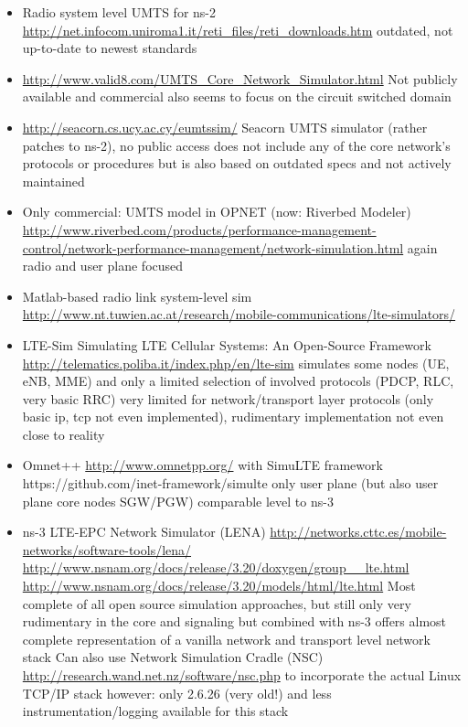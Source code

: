 \begin{itemize}

	\item Radio system level UMTS for ns-2
\url{http://net.infocom.uniroma1.it/reti_files/reti_downloads.htm}
outdated, not up-to-date to newest standards

	\item \url{http://www.valid8.com/UMTS_Core_Network_Simulator.html} Not publicly available and commercial
also seems to focus on the circuit switched domain

	\item \url{http://seacorn.cs.ucy.ac.cy/eumtssim/}
\cite{vranjevs2011use}
Seacorn UMTS simulator (rather patches to ns-2), no public access
does not include any of the core network's protocols or procedures
but is also based on outdated specs and not actively maintained

	\item Only commercial: UMTS model in OPNET (now: Riverbed Modeler)
\url{http://www.riverbed.com/products/performance-management-control/network-performance-management/network-simulation.html}
again radio and user plane focused 

	\item Matlab-based radio link system-level sim
\url{http://www.nt.tuwien.ac.at/research/mobile-communications/lte-simulators/}

	\item LTE-Sim
Simulating LTE Cellular Systems: An Open-Source Framework \cite{5634134}
\url{http://telematics.poliba.it/index.php/en/lte-sim}
simulates some nodes (UE, eNB, MME) and only a limited selection of involved protocols (PDCP, RLC, very basic RRC)
very limited for network/transport layer protocols (only basic ip, tcp not even implemented), rudimentary implementation not even close to reality

	\item Omnet++ \url{http://www.omnetpp.org/}
with SimuLTE framework https://github.com/inet-framework/simulte
only user plane (but also user plane core nodes SGW/PGW)
comparable level to ns-3

	\item ns-3
\gls{LTE}-\gls{EPC} Network Simulator (LENA)\cite{Baldo:2013:OSM:2507924.2507940} 
\url{http://networks.cttc.es/mobile-networks/software-tools/lena/}
\url{http://www.nsnam.org/docs/release/3.20/doxygen/group__lte.html}
\url{http://www.nsnam.org/docs/release/3.20/models/html/lte.html}
Most complete of all open source simulation approaches, but still only very rudimentary in the core and signaling
but combined with ns-3 offers almost complete representation of a vanilla network and transport level network stack
Can also use Network Simulation Cradle (NSC) \url{http://research.wand.net.nz/software/nsc.php}
to incorporate the actual Linux TCP/IP stack
however: only 2.6.26 (very old!)
and less instrumentation/logging available for this stack

\end{itemize}



